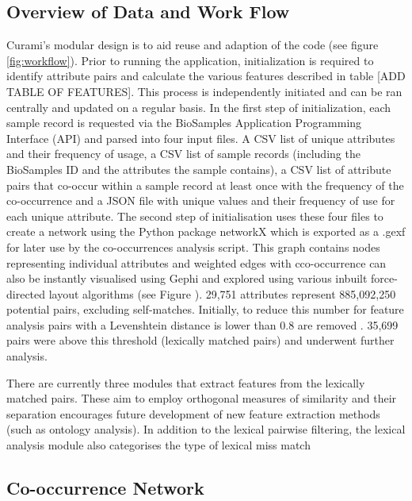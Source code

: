 \documentclass{bmcart}
\begin{document}
\subsection*{Overview of Data and Work Flow}

Curami's modular design is to aid reuse and adaption of the code (see figure \ref{fig:workflow}). Prior to running the application, initialization is required to identify attribute pairs and calculate the various features described in table [ADD TABLE OF FEATURES]. This process is independently initiated and can be ran centrally and updated on a regular basis. In the first step of initialization, each sample record is requested via the BioSamples Application Programming Interface (API) and parsed into four input files. A CSV list of unique attributes and their frequency of usage, a CSV list of sample records (including the BioSamples ID and the attributes the sample contains), a CSV list of attribute pairs that co-occur within a sample record at least once with the frequency of the co-occurrence and a JSON file with unique values and their frequency of use for each unique attribute. The second step of initialisation uses these four files to create a network using the Python package networkX \cite{networkx} which is exported as a .gexf for later use by the co-occurrences analysis script. This graph contains nodes representing individual attributes and weighted edges with cco-occurrence can also be instantly visualised using Gephi \cite{bastian2009gephi} and explored using various inbuilt force-directed layout algorithms \cite{jacomy2014forceatlas2} (see Figure \cite{fig:gephi}). 29,751 attributes represent 885,092,250 potential pairs, excluding self-matches. Initially, to reduce this number for feature analysis pairs with a Levenshtein distance is lower than 0.8 are removed \cite{levenshtein1966binary}. 35,699 pairs were above this threshold (lexically matched pairs) and underwent further analysis.

There are currently three modules that extract features from the lexically matched pairs. These aim to employ orthogonal measures of similarity and their separation encourages future development of new feature extraction methods (such as ontology analysis). In addition to the lexical pairwise filtering, the lexical analysis module also categorises the type of lexical miss match

\subsection*{Co-occurrence Network}
\end{document}
